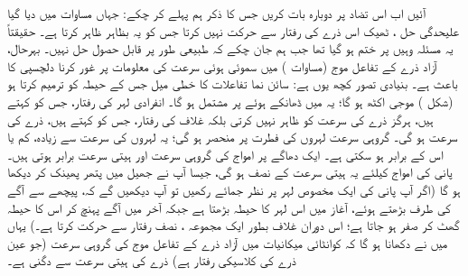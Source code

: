 آئیں اب اس تضاد پر دوبارہ بات کریں جس کا ذکر ہم پہلے کر چکے: جہاں مساوات  میں دیا گیا علیحدگی حل ، ٹھیک اس ذرے کی رفتار سے حرکت نہیں کرتا  جس کو یہ بظاہر ظاہر کرتا ہے۔ حقیقتاً یہ مسئلہ وہیں پر ختم ہو گیا تھا جب ہم جان چکے کہ  طبیعی طور پر قابل حصول حل نہیں۔ بہرحال،  آزاد ذرے کے تفاعل موج (مساوات )  میں سموئی  ہوئی سرعت کی معلومات پر غور کرنا دلچسپی کا باعث ہے۔ بنیادی تصور کچھ یوں ہے: سائن نما تفاعلات کا خطی میل جس کے حیطہ کو   ترمیم کرتا ہو (شکل )  موجی اکٹھ ہو گا؛ یہ  میں ڈھانکے ہوئے  پر مشتمل ہو گا۔ انفرادی لہر کی رفتار، جس کو   کہتے ہیں، ہرگز ذرے کی   سرعت کو ظاہر نہیں کرتی  بلکہ غلاف کی رفتار، جس کو  کہتے ہیں، ذرے کی سرعت  ہو گی۔ گروہی سرعت لہروں کی فطرت پر منحصر ہو گی؛ یہ لہروں کی  سرعت سے زیادہ، کم یا اس کے برابر ہو سکتی ہے۔ ایک دھاگے پر امواج کی گروہی سرعت اور ہیتی سرعت برابر ہوتی   ہیں۔ پانی کی امواج کیلئے یہ ہیتی سرعت کے نصف ہو گی، جیسا آپ نے جھیل میں پتھر پھینک کر دیکھا ہو گا (اگر آپ پانی کی ایک مخصوص لہر پر نظر جمائے رکھیں تو آپ دیکھیں گے کہ، پیچھے سے آگے کی طرف بڑھتے ہوئے، آغاز میں اس لہر کا حیطہ بڑھتا ہے جبکہ آخر میں آگے پہنچ کر اس کا حیطہ گھٹ کر صفر ہو جاتا ہے؛ اس دوران  غلاف بطور ایک مجموعہ ، نصف رفتار سے حرکت کرتا ہے۔)  یہاں میں نے دکھانا ہو گا کہ کوانٹائی میکانیات میں آزاد ذرے کے تفاعل موج کی گروہی سرعت (جو عین ذرے کی کلاسیکی رفتار ہے)  ذرے  کی  ہیتی سرعت سے دگنی ہے۔

